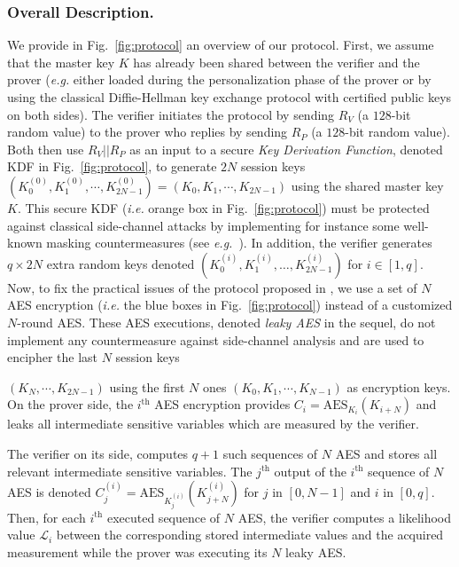 \subsubsection{Overall Description.}\label{sssec:overall}
We provide in Fig.~\ref{fig:protocol} an overview of our protocol. 
First, we assume that the master key $K$ has already been shared between the verifier and the prover (\emph{e.g.} either loaded during the personalization phase of the prover or by using the classical Diffie-Hellman key exchange protocol with certified public keys on both sides).
The verifier initiates the protocol by sending $R_V$ (a $128$-bit random value) to the prover who replies by sending $R_P$ (a $128$-bit random value). Both then use $R_V || R_P$ as an input to a secure \textit{Key Derivation Function}, denoted KDF in Fig.~\ref{fig:protocol}, to generate $2N$ session keys $(K_0^{(0)}, K_1^{(0)}, \cdots, K_{2N-1}^{(0)}) = (K_0, K_1, \cdots, K_{2N-1})$ using the shared master key $K$.
This secure KDF (\emph{i.e.} orange box in Fig.~\ref{fig:protocol}) must be protected against classical side-channel attacks by implementing for instance some well-known masking countermeasures (see \emph{e.g.}~\cite{DBLP:conf/eurocrypt/Coron14,DBLP:conf/ches/GenellePQ11,DBLP:conf/ches/RivainP10}). In addition, the verifier generates $q \times 2N$ extra random keys denoted $(K_0^{(i)}, K_1^{(i)}, \dots, K_{2N-1}^{(i)})$ for $i \in [1,q]$. Now, to fix the practical issues of the protocol proposed in \cite{SakiyamaMMKHMMN15}, we use a set of $N$ AES encryption (\emph{i.e.} the 	blue boxes in Fig.~\ref{fig:protocol}) instead of a customized $N$-round AES. 
These AES executions, denoted \textit{leaky AES} in the sequel, do not implement any countermeasure against side-channel analysis and are used to encipher the last $N$ session keys

$(K_N, \cdots, K_{2N-1})$ using the first $N$ ones $(K_0, K_1, \cdots, K_{N-1})$ as encryption keys.\newline
On the prover side, the $i^{\text{th}}$ AES encryption provides $C_i = \mbox{AES}_{K_i}(K_{i+N})$ and leaks all intermediate sensitive variables which are measured by the verifier.

The verifier on its side, computes $q+1$ such sequences of $N$ AES and stores all relevant intermediate sensitive variables. The $j^\text{th}$ output of the $i^\text{th}$ sequence of $N$ AES is denoted $C_j^{(i)} = \mbox{AES}_{K_j^{(i)}}(K_{j+N}^{(i)})$ for $j$ in $[0,N-1]$ and $i$ in $[0,q]$.
Then, for each $i^\text{th}$ executed sequence of $N$ AES, the verifier computes a likelihood value $\mathcal{L}_i$ between the corresponding stored intermediate values and the acquired measurement while the prover was executing its $N$ leaky AES.


